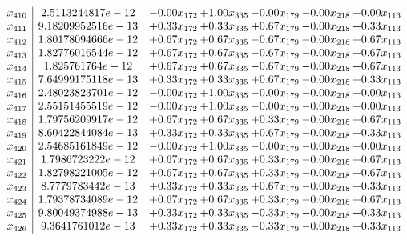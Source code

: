 \documentclass[8pt]{article}
\begin{document}
\[\begin{array}{c| c c@{\hskip 2pt} c@{\hskip 2pt} c@{\hskip 2pt} c@{\hskip 2pt} c@{\hskip 2pt} }
 x_{410}   &  2.5113244817e-12 & -0.00 x_{172} & +  1.00 x_{335} & -0.00 x_{179} & -0.00 x_{218} & -0.00 x_{113}\\
 x_{411}   &  9.18209952516e-13 & +  0.33 x_{172} & +  0.33 x_{335} & +  0.67 x_{179} & -0.00 x_{218} & +  0.33 x_{113}\\
 x_{412}   &  1.80178094666e-12 & +  0.67 x_{172} & +  0.67 x_{335} & -0.67 x_{179} & -0.00 x_{218} & +  0.67 x_{113}\\
 x_{413}   &  1.82776016544e-12 & +  0.67 x_{172} & +  0.67 x_{335} & -0.67 x_{179} & -0.00 x_{218} & +  0.67 x_{113}\\
 x_{414}   &  1.825761764e-12 & +  0.67 x_{172} & +  0.67 x_{335} & -0.67 x_{179} & -0.00 x_{218} & +  0.67 x_{113}\\
 x_{415}   &  7.64999175118e-13 & +  0.33 x_{172} & +  0.33 x_{335} & +  0.67 x_{179} & -0.00 x_{218} & +  0.33 x_{113}\\
 x_{416}   &  2.48023823701e-12 & -0.00 x_{172} & +  1.00 x_{335} & -0.00 x_{179} & -0.00 x_{218} & -0.00 x_{113}\\
 x_{417}   &  2.55151455519e-12 & -0.00 x_{172} & +  1.00 x_{335} & -0.00 x_{179} & -0.00 x_{218} & -0.00 x_{113}\\
 x_{418}   &  1.79756209917e-12 & +  0.67 x_{172} & +  0.67 x_{335} & +  0.33 x_{179} & -0.00 x_{218} & +  0.67 x_{113}\\
 x_{419}   &  8.60422844084e-13 & +  0.33 x_{172} & +  0.33 x_{335} & +  0.67 x_{179} & -0.00 x_{218} & +  0.33 x_{113}\\
 x_{420}   &  2.54685161849e-12 & -0.00 x_{172} & +  1.00 x_{335} & -0.00 x_{179} & -0.00 x_{218} & -0.00 x_{113}\\
 x_{421}   &  1.7986723222e-12 & +  0.67 x_{172} & +  0.67 x_{335} & +  0.33 x_{179} & -0.00 x_{218} & +  0.67 x_{113}\\
 x_{422}   &  1.82798221005e-12 & +  0.67 x_{172} & +  0.67 x_{335} & +  0.33 x_{179} & -0.00 x_{218} & +  0.67 x_{113}\\
 x_{423}   &  8.7779783442e-13 & +  0.33 x_{172} & +  0.33 x_{335} & +  0.67 x_{179} & -0.00 x_{218} & +  0.33 x_{113}\\
 x_{424}   &  1.79378734089e-12 & +  0.67 x_{172} & +  0.67 x_{335} & +  0.33 x_{179} & -0.00 x_{218} & +  0.67 x_{113}\\
 x_{425}   &  9.80049374988e-13 & +  0.33 x_{172} & +  0.33 x_{335} & -0.33 x_{179} & -0.00 x_{218} & +  0.33 x_{113}\\
 x_{426}   &  9.3641761012e-13 & +  0.33 x_{172} & +  0.33 x_{335} & -0.33 x_{179} & -0.00 x_{218} & +  0.33 x_{113}\\

\end{array}\]
\end{document}
